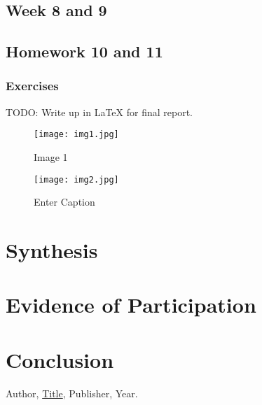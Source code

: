 \documentclass{article}
\theoremstyle{theorem}
\theoremstyle{definition}
\theoremstyle{remark}
\begin{document}
\subsection{Week 8 and 9}

\subsection{Homework 10 and 11}

\subsubsection{Exercises}
TODO: Write up in LaTeX for final report.
\begin{figure}
    \centering
    \texttt{[image: img1.jpg]}
    \caption{Image 1}
    \label{fig:enter-label}
\end{figure}

\begin{figure}
        \centering
        \texttt{[image: img2.jpg]}
        \caption{Enter Caption}
        \label{fig:enter-label}
\end{figure}

\section{Synthesis}

\section{Evidence of Participation}

\section{Conclusion}\label{conclusion}

\begin{thebibliography}{99}
 Author, \href{https://en.wikipedia.org/wiki/LaTeX}{Title}, Publisher, Year.
\end{thebibliography}
\end{document}
